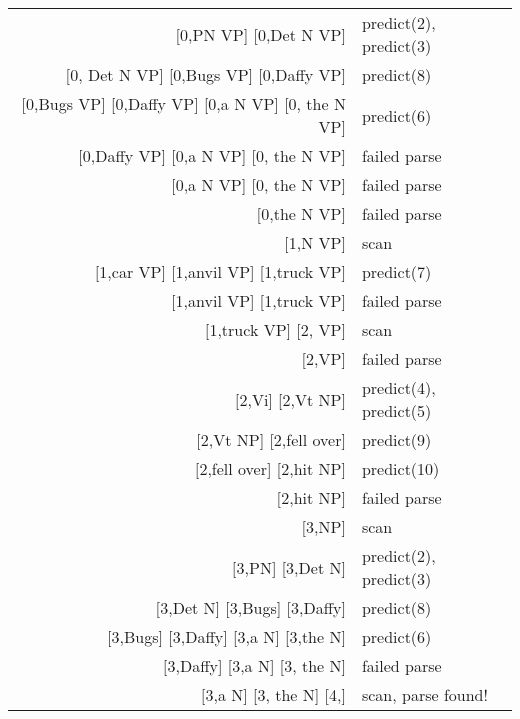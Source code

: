 \begin{examplebox}
\begin{center}
\begin{tabular}{r|l}
            $\lbrack$0,PN VP] [0,Det N VP] & predict(2), predict(3)\\
            $\lbrack$0, Det N VP] [0,Bugs VP] [0,Daffy VP] & predict(8)\\
            $\lbrack$0,Bugs VP] [0,Daffy VP] [0,a N VP] [0, the N VP]& predict(6)\\
            $\lbrack$0,Daffy VP] [0,a N VP] [0, the N VP]& failed parse\\
            $\lbrack$0,a N VP] [0, the N VP]& failed parse\\
            $\lbrack$0,the N VP]& failed parse\\
            $\lbrack$1,N VP]& scan\\
            $\lbrack$1,car VP] [1,anvil VP] [1,truck VP] & predict(7)\\
            $\lbrack$1,anvil VP] [1,truck VP] & failed parse\\
            $\lbrack$1,truck VP] [2, VP] & scan\\
            $\lbrack$2,VP] & failed parse\\
            $\lbrack$2,Vi] [2,Vt NP] & predict(4), predict(5)\\
            $\lbrack$2,Vt NP] [2,fell over] & predict(9)\\
            $\lbrack$2,fell over] [2,hit NP] & predict(10)\\
            $\lbrack$2,hit NP] & failed parse\\
            $\lbrack$3,NP] & scan\\
            $\lbrack$3,PN] [3,Det N] & predict(2), predict(3)\\
            $\lbrack$3,Det N] [3,Bugs] [3,Daffy] & predict(8)\\
            $\lbrack$3,Bugs] [3,Daffy] [3,a N] [3,the N] & predict(6)\\
            $\lbrack$3,Daffy] [3,a N] [3, the N] & failed parse\\
            $\lbrack$3,a N] [3, the N] [4,] & scan, parse found!\\
        \end{tabular}
    \end{center}
\end{examplebox}

